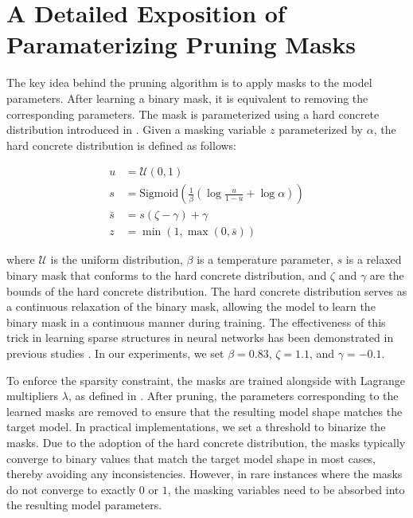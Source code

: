 \appendix
\tableofcontents
\section{A Detailed Exposition of Paramaterizing Pruning Masks}
\label{app:pruning_algo}
The key idea behind the pruning algorithm is to apply masks to the model parameters. After learning a binary mask, it is equivalent to removing the corresponding parameters. The mask is parameterized using a hard concrete distribution introduced in \cite{louizos2018learning}. Given a masking variable $z$ parameterized by $\alpha$, the hard concrete distribution is defined as follows:

\begin{equation*}
    \begin{aligned}
    u &= \mathcal{U}(0, 1) \\
    s &= \text{Sigmoid}\left(\frac{1}{\beta}\left(\log \frac{u}{1-u} + \log \alpha\right) \right) \\
    \bar s &= s(\zeta - \gamma) + \gamma \\
    z & = \min(1, \max(0, \bar s))
    \end{aligned}
\end{equation*}

where $\mathcal{U}$ is the uniform distribution, $\beta$ is a temperature parameter, $s$ is a relaxed binary mask that conforms to the hard concrete distribution, and $\zeta$ and $\gamma$ are the bounds of the hard concrete distribution. The hard concrete distribution serves as a continuous relaxation of the binary mask, allowing the model to learn the binary mask in a continuous manner during training. The effectiveness of this trick in learning sparse structures in neural networks has been demonstrated in previous studies \citep{wang2020structured,xia-etal-2022-structured}. In our experiments, we set $\beta = 0.83$, $\zeta = 1.1$, and $\gamma = -0.1$.

To enforce the sparsity constraint, the masks are trained alongside with Lagrange multipliers $\lambda$, as defined in . After pruning, the parameters corresponding to the learned masks are removed to ensure that the resulting model shape matches the target model. In practical implementations, we set a threshold to binarize the masks. Due to the adoption of the hard concrete distribution, the masks typically converge to binary values that match the target model shape in most cases, thereby avoiding any inconsistencies. However, in rare instances where the masks do not converge to exactly $0$ or $1$, the masking variables need to be absorbed into the resulting model parameters. 

